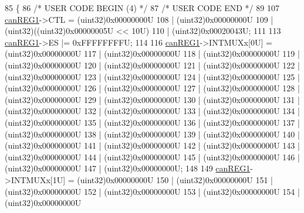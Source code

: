 \begin{DoxyCode}
85 \{
86 \textcolor{comment}{/* USER CODE BEGIN (4) */}
87 \textcolor{comment}{/* USER CODE END */}
89 
107     \mbox{\hyperlink{reg__can_8h_a7a0d043070590fc91cfa3c0e39379b19}{canREG1}}->CTL = (uint32)0x00000000U 
108                  | (uint32)0x00000000U 
109                  | (uint32)((uint32)0x00000005U  << 10U)
110                  | (uint32)0x00020043U;
111 
113     \mbox{\hyperlink{reg__can_8h_a7a0d043070590fc91cfa3c0e39379b19}{canREG1}}->ES |= 0xFFFFFFFFU;
114 
116     \mbox{\hyperlink{reg__can_8h_a7a0d043070590fc91cfa3c0e39379b19}{canREG1}}->INTMUXx[0U] = (uint32)0x00000000U
117                          | (uint32)0x00000000U
118                          | (uint32)0x00000000U
119                          | (uint32)0x00000000U
120                          | (uint32)0x00000000U
121                          | (uint32)0x00000000U
122                          | (uint32)0x00000000U
123                          | (uint32)0x00000000U
124                          | (uint32)0x00000000U
125                          | (uint32)0x00000000U
126                          | (uint32)0x00000000U
127                          | (uint32)0x00000000U
128                          | (uint32)0x00000000U
129                          | (uint32)0x00000000U
130                          | (uint32)0x00000000U
131                          | (uint32)0x00000000U
132                          | (uint32)0x00000000U
133                          | (uint32)0x00000000U
134                          | (uint32)0x00000000U
135                          | (uint32)0x00000000U
136                          | (uint32)0x00000000U
137                          | (uint32)0x00000000U
138                          | (uint32)0x00000000U
139                          | (uint32)0x00000000U
140                          | (uint32)0x00000000U
141                          | (uint32)0x00000000U
142                          | (uint32)0x00000000U
143                          | (uint32)0x00000000U
144                          | (uint32)0x00000000U
145                          | (uint32)0x00000000U
146                          | (uint32)0x00000000U
147                          | (uint32)0x00000000U;
148 
149     \mbox{\hyperlink{reg__can_8h_a7a0d043070590fc91cfa3c0e39379b19}{canREG1}}->INTMUXx[1U] = (uint32)0x00000000U
150                          | (uint32)0x00000000U
151                          | (uint32)0x00000000U
152                          | (uint32)0x00000000U
153                          | (uint32)0x00000000U
154                          | (uint32)0x00000000U

\end{DoxyCode}
